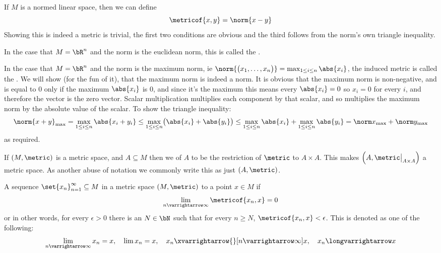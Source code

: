 \documentclass[10pt]{article}
\let\to=\varrightarrow
\begin{document}
\begin{exam*}

    If $M$ is a normed linear space, then we can define
    \[ \metricof{x,y} = \norm{x-y} \]
    Showing this is indeed a metric is trivial, the first two conditions are obvious and the third follows from the norm's own triangle inequality.

    In the case that $M=\bR^n$ and the norm is the euclidean norm, this is called the .

    In the case that $M=\bR^n$ and the norm is the maximum norm, ie $\norm{\bigl(x_1,\dots,x_n\bigr)}=\max_{1\leq i\leq n}\abs{x_i}$, the induced metric is called the .
    We will show (for the fun of it), that the maximum norm is indeed a norm.
    It is obvious that the maximum norm is non-negative, and is equal to $0$ only if the maximum $\abs{x_i}$ is $0$, and since it's the maximum this means every $\abs{x_i}=0$ so $x_i=0$ for every $i$,
    and therefore the vector is the zero vector.
    Scalar multiplication multiplies each component by that scalar, and so multiplies the maximum norm by the absolute value of the scalar.
    To show the triangle inequality:
    \[ \norm{x+y}_{\max} = \max_{1\leq i\leq n}\abs{x_i+y_i} \leq \max_{1\leq i\leq n}\bigl(\abs{x_i} + \abs{y_i}\bigr) \leq \max_{1\leq i\leq n}\abs{x_i} + \max_{1\leq i\leq n}\abs{y_i} =
    \norm x_{\max} + \norm y_{\max} \]
    as required.

\end{exam*}

\begin{defn*}

    If $(M,\metric)$ is a metric space, and $A\subseteq M$ then we  of $A$ to be the restriction of $\metric$ to $A\times A$.
    This makes $\Bigl(A,\metric\bigl|_{A\times A}\Bigr)$ a metric space.
    As another abuse of notation we commonly write this as just $(A,\metric)$.

\end{defn*}

\begin{defn*}

    A sequence $\set{x_n}_{n=1}^\infty\subseteq M$ in a metric space $(M,\metric)$  to a point $x\in M$ if
    \[ \lim_{n\to\infty}\metricof{x_n,x} = 0 \]
    or in other words, for every $\epsilon>0$ there is an $N\in\bN$ such that for every $n\geq N$, $\metricof{x_n,x}<\epsilon$.
    This is denoted as one of the following:
    \[ \lim_{n\to\infty}x_n = x,\quad \lim x_n = x,\quad x_n\xvarrightarrow{}[n\to\infty] x,\quad x_n\longvarrightarrow x \]

\end{defn*}
\end{document}
